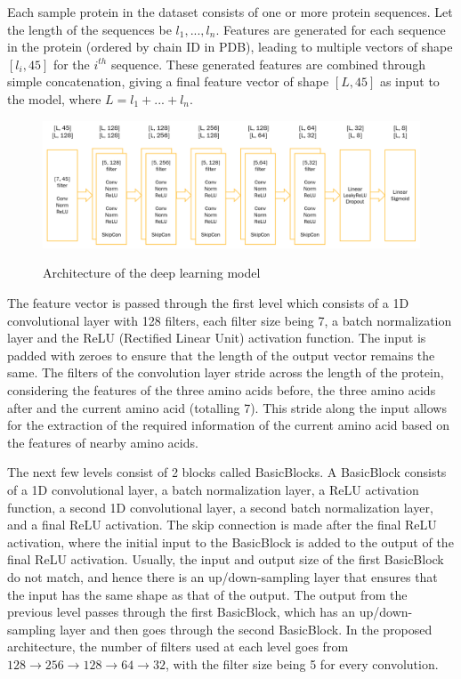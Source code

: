 \documentclass[journal=jacsat,manuscript=article]{achemso}
\begin{document}
Each sample protein in the dataset consists of one or more protein sequences. Let the length of the sequences be $l_1, ..., l_n$. Features are generated for each sequence in the protein (ordered by chain ID in PDB), leading to multiple vectors of shape $[l_i, 45]$ for the $i^{th}$ sequence. These generated features are combined through simple concatenation, giving a final feature vector of shape $[L, 45]$ as input to the model, where $L = l_1 + ... + l_n$.

\begin{figure}
    \caption{\centering Architecture of the deep learning model}
    \centering
    \noindent\includegraphics[scale=0.36]{architecture}
    \label{fig:architecture}
\end{figure}

The feature vector is passed through the first level which consists of a 1D convolutional layer with 128 filters, each filter size being 7, a batch normalization layer and the ReLU (Rectified Linear Unit) activation function. The input is padded with zeroes to ensure that the length of the output vector remains the same. The filters of the convolution layer stride across the length of the protein, considering the features of the three amino acids before, the three amino acids after and the current amino acid (totalling 7). This stride along the input allows for the extraction of the required information of the current amino acid based on the features of nearby amino acids.

The next few levels consist of 2 blocks called BasicBlocks. A BasicBlock consists of a 1D convolutional layer, a batch normalization layer, a ReLU activation function, a second 1D convolutional layer, a second batch normalization layer, and a final ReLU activation. The skip connection is made after the final ReLU activation, where the initial input to the BasicBlock is added to the output of the final ReLU activation. Usually, the input and output size of the first BasicBlock do not match, and hence there is an up/down-sampling layer that ensures that the input has the same shape as that of the output. The output from the previous level passes through the first BasicBlock, which has an up/down-sampling layer and then goes through the second BasicBlock. In the proposed architecture, the number of filters used at each level goes from $128 \to 256 \to 128 \to 64 \to 32$, with the filter size being 5 for every convolution.
\end{document}
